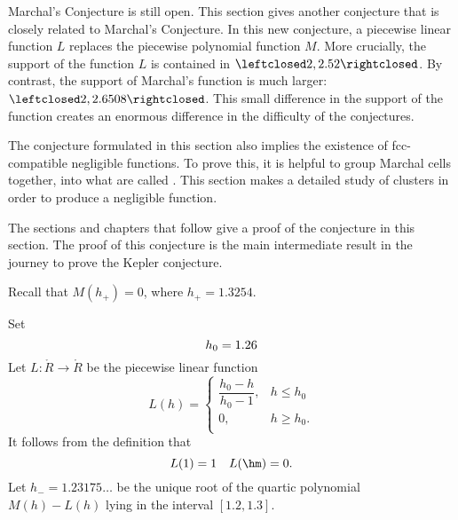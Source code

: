 \begin{summary} Marchal's Conjecture is still open.  This section
gives another conjecture that is closely related to Marchal's
Conjecture.  In this new conjecture, a piecewise linear function $L$
replaces the piecewise polynomial function $M$.  More crucially, the
support of the function $L$ is contained in
$\leftclosed2,2.52\rightclosed$.  By contrast, the support of
Marchal's function is much larger:
$\leftclosed2,2.6508\rightclosed$.  This small difference in the
support of the function creates an enormous difference in the
difficulty of the conjectures.

The conjecture formulated in this section also implies the existence
of fcc-compatible negligible functions.  To prove this, it is
helpful to group Marchal cells together, into what are called
.  This section makes a detailed study of clusters
in order to produce a negligible function.

The sections and chapters that follow give a proof of the
conjecture in this section.  The proof of this conjecture is the
main intermediate result in the journey to prove the Kepler
conjecture.
\end{summary}

Recall that $M(h_+) = 0$, where   $h_+ = 1.3254$.
%

\begin{definition}[$L$,~$h_0$,~$h_-$]\label{def:L} 
Set
\begin{displaymath} 
h_0 = 1.26\\  %
\end{displaymath}
Let $L:\ring{R}\to\ring{R}$ be the piecewise linear function 
\begin{displaymath} 
L(h) = \begin{cases} 
\dfrac{h_0-h}{h_0-1}, & h \le h_0 \\
0, & h\ge h_0. \\
\end{cases}
\end{displaymath}
It follows from the definition that
\begin{displaymath} 
L(1) = 1\quad L(\hm) = 0.
\end{displaymath}
Let $h_- = 1.23175\ldots$ be the unique root of the quartic polynomial
$M(h)-L(h)$ lying in the interval $[1.2,1.3]$.
%
%
%
\end{definition}

